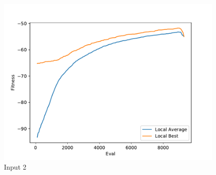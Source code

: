 \documentclass{standalone}
\begin{document}
\begin{figure}[!htb]
	\caption{Input 2}
	\label{fig:graph_2032}
	\includegraphics[width=\textwidth]{../graphs/graphs/2032.pdf}
\end{figure}
\end{document}
